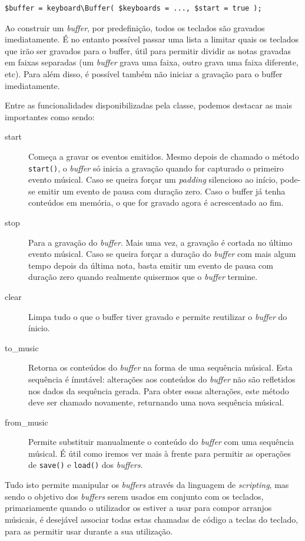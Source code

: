 \begin{lstlisting}[caption={Instanciação de um \textit{buffer}}]
$buffer = keyboard\Buffer( $keyboards = ..., $start = true );
\end{lstlisting}
Ao construir um \textit{buffer}, por predefinição, todos os teclados são gravados imediatamente. É no entanto possível passar uma lista a limitar quais os teclados que irão ser gravados para o buffer, útil para permitir dividir as notas gravadas em faixas separadas (um \textit{buffer} grava uma faixa, outro grava uma faixa diferente, etc). Para além disso, é possível também não iniciar a gravação para o buffer imediatamente. 

Entre as funcionalidades disponibilizadas pela classe, podemos destacar as mais importantes como sendo:
\begin{description}
 \item[start] Começa a gravar os eventos emitidos. Mesmo depois de chamado o método \texttt{start()}, o \textit{buffer} só inicia a gravação quando for capturado o primeiro evento músical. Caso se queira forçar um \textit{padding} silencioso ao início, pode-se emitir um evento de pausa com duração zero. Caso o buffer já tenha conteúdos em memória, o que for gravado agora é acrescentado ao fim.
 \item[stop] Para a gravação do \textit{buffer}. Mais uma vez, a gravação é cortada no último evento músical. Caso se queira forçar a duração do \textit{buffer} com mais algum tempo depois da última nota, basta emitir um evento de pausa com duração zero quando realmente quisermos que o \textit{buffer} termine.
 \item[clear] Limpa tudo o que o buffer tiver gravado e permite reutilizar o \textit{buffer} do ínicio.
 \item[to\_music] Retorna os conteúdos do \textit{buffer} na forma de uma sequência músical. Esta sequência é ímutável: alterações aos conteúdos do \textit{buffer} não são refletidos nos dados da sequência gerada. Para obter essas alterações, este método deve ser chamado novamente, returnando uma nova sequência músical.
 \item[from\_music] Permite substituir manualmente o conteúdo do \textit{buffer} com uma sequência músical. É útil como iremos ver mais à frente para permitir as operações de \texttt{save()} e \texttt{load()} dos \textit{buffers}.
\end{description}

Tudo isto permite manipular os \textit{buffers} através da linguagem de \textit{scripting}, mas sendo o objetivo dos \textit{buffers} serem usados em conjunto com os teclados, primariamente quando o utilizador os estiver a usar para compor arranjos músicais, é desejável associar todas estas chamadas de código a teclas do teclado, para as permitir usar durante a sua utilização.


